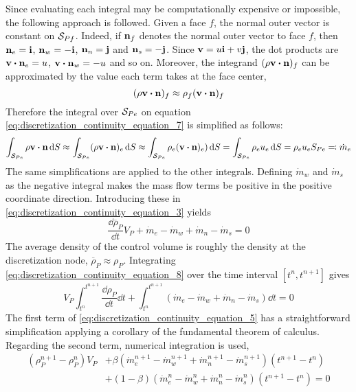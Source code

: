 Since evaluating each integral may be computationally expensive or impossible,
the following approach is followed. Given a face $f$, the normal outer vector is
constant on $\mathcal{S}_{Pf}$. Indeed, if $\vb{n}_f$ denotes the normal outer vector to
face $f$, then $\vb{n}_e = \vb{i}$, $\vb{n}_w = -\vb{i}$, $\vb{n}_n = \vb{j}$
and $\vb{n}_s = -\vb{j}$. Since $\vb{v} = u \vb{i} + v \vb{j}$, the dot products
are $\vb{v} \vdot \vb{n}_e = u$, $\vb{v} \vdot \vb{n}_w = -u$ and so on.
Moreover, the integrand $(\rho \vb{v} \vdot \vb{n})_f$ can be approximated by
the value each term takes at the face center, \ie
\begin{equation}
	(\rho \vb{v} \vdot \vb{n})_f \approx \rho_f (\vb{v} \vdot \vb{n})_f
\end{equation}
Therefore the integral over $\mathcal{S}_{Pe}$ on equation
\eqref{eq:discretization_continuity_equation_7} is simplified as follows:
\begin{align}
	\int_{\cs{Pe}} \rho \vb{v} \vdot \vb{n} \dd{S} \approx
	\int_{\cs{Pe}} (\rho \vb{v} \vdot \vb{n})_e \dd{S} \approx
	\int_{\cs{Pe}} \rho_e (\vb{v} \vdot \vb{n})_e) \dd{S} = 
	\int_{\cs{Pe}} \rho_e u_e \dd{S} = 
	\rho_e u_e S_{Pe} \eqqcolon \dot{m}_e
\end{align}
The same simplifications are applied to the other integrals. Defining
$\dot{m}_w$ and $\dot{m}_s$ as the negative integral makes the mass flow terms
be positive in the positive coordinate direction. Introducing these in
\eqref{eq:discretization_continuity_equation_3} yields
\begin{equation} \label{eq:discretization_continuity_equation_8}
	\frac{\dd \overline{\rho}_P}{\dd{t}} V_P 
	+ \dot{m}_e - \dot{m}_w + \dot{m}_n - \dot{m}_s = 0
\end{equation}
The average density of the control volume is roughly the density at the
discretization node, \ie $\overline{\rho}_P \approx \rho_P$. Integrating
\eqref{eq:discretization_continuity_equation_8} over the time interval $[t^n,
t^{n+1}]$ gives
\begin{equation} \label{eq:discretization_continuity_equation_5}
	V_P \int_{t^n}^{t^{n+1}} \frac{\dd \rho_P}{\dd{t}} \dd{t} + 
	\int_{t^n}^{t^{n+1}} ( \dot{m}_e - \dot{m}_w + \dot{m}_n - \dot{m}_s ) \dd{t} = 0
\end{equation}
The first term of \eqref{eq:discretization_continuity_equation_5} has a
straightforward simplification applying a corollary of the fundamental theorem
of calculus. Regarding the second term, numerical integration is used,
\begin{align} 
	(\rho_P^{n+1} - \rho_P^n) V_P
	&+ \beta (\dot{m}_e^{n+1} - \dot{m}_w^{n+1} + \dot{m}_n^{n+1} - \dot{m}_s^{n+1}) (t^{n+1} - t^n) 
	\nonumber \\
	&+ (1 - \beta) (\dot{m}_e^n - \dot{m}_w^n + \dot{m}_n^n - \dot{m}_s^n) (t^{n+1} - t^n) = 0
	\label{eq:discretization_continuity_equation_6}
\end{align}
